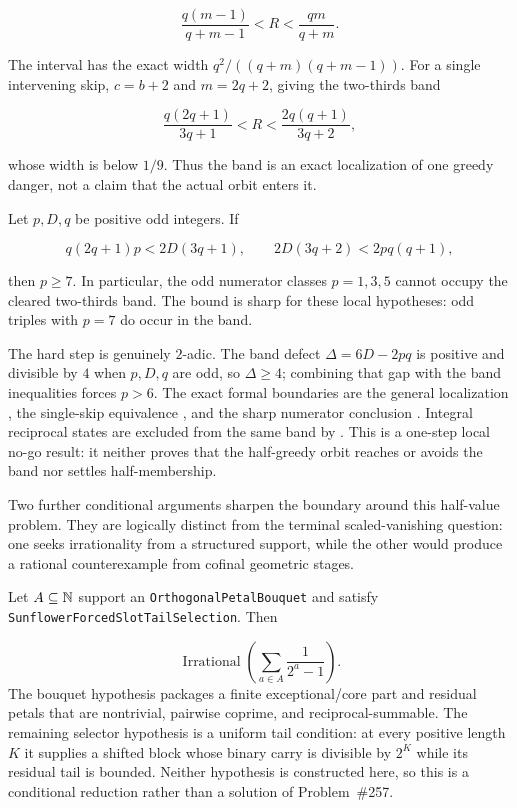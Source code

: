 \documentclass[11pt]{article}
\begin{document}
\[
  \frac{q(m-1)}{q+m-1}<R<\frac{qm}{q+m}.
\]

The interval has the exact width
$q^2/((q+m)(q+m-1))$.  For a single intervening skip, $c=b+2$ and
$m=2q+2$, giving the two-thirds band

\[
  \frac{q(2q+1)}{3q+1}<R<\frac{2q(q+1)}{3q+2},
\]

whose width is below $1/9$.  Thus the band is an exact localization of one
greedy danger, not a claim that the actual orbit enters it.

\begin{theorem}
\label{res:twothirdsband}
Let $p,D,q$ be positive odd integers.  If

\[
 q(2q+1)p<2D(3q+1),
 \qquad
 2D(3q+2)<2pq(q+1),
\]

then $p\ge7$.  In particular, the odd numerator classes $p=1,3,5$ cannot
occupy the cleared two-thirds band.  The bound is sharp for these local
hypotheses: odd triples with $p=7$ do occur in the band.
\end{theorem}

\noindent The hard step is genuinely $2$-adic.  The band defect
$\Delta=6D-2pq$ is positive and divisible by $4$ when $p,D,q$ are odd, so
$\Delta\ge4$; combining that gap with the band inequalities forces $p>6$.
The exact formal boundaries are the general localization
,
the single-skip equivalence
,
and the sharp numerator conclusion
.
Integral reciprocal states are excluded from the same band by
.
This is a one-step local no-go result: it neither proves that the half-greedy
orbit reaches or avoids the band nor settles half-membership.

Two further conditional arguments sharpen the boundary around this half-value
problem.  They are logically distinct from the terminal scaled-vanishing
question: one seeks irrationality from a structured support, while the other
would produce a rational counterexample from cofinal geometric stages.

\begin{theorem}
\label{res:sunflower}
Let $A\subseteq\mathbb{N}$ support an
\texttt{OrthogonalPetalBouquet} and satisfy
\texttt{SunflowerForcedSlotTailSelection}.  Then

\[
  \operatorname{Irrational}\!\left(\sum_{a\in A}\frac{1}{2^a-1}\right).
\]
The bouquet hypothesis packages a finite exceptional/core part and residual
petals that are nontrivial, pairwise coprime, and reciprocal-summable.  The
remaining selector hypothesis is a uniform tail condition: at every positive
length $K$ it supplies a shifted block whose binary carry is divisible by
$2^K$ while its residual tail is bounded.  Neither hypothesis is constructed
here, so this is a conditional reduction rather than a solution of
Problem~\#257.
\end{theorem}
\end{document}
